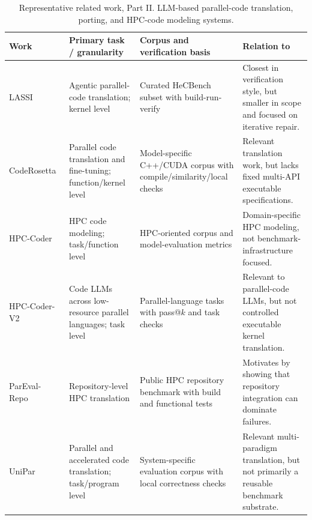 \begin{table}[p]
\centering
\caption{
Representative related work, Part II. LLM-based parallel-code translation, porting, and HPC-code modeling systems.
}
\label{tab:related-work-c}
\scriptsize
\setlength{\tabcolsep}{3.2pt}
\renewcommand{\arraystretch}{1.05}
\begin{tabularx}{\textwidth}{@{}
>{\RaggedRight\arraybackslash}p{}
>{\RaggedRight\arraybackslash}p{}
>{\RaggedRight\arraybackslash}p{}
>{\RaggedRight\arraybackslash}X
@{}}
\toprule
Work & Primary task / granularity & Corpus and verification basis & Relation to \parbench{} \\
\midrule

LASSI~\cite{LASSI2024}
& Agentic parallel-code translation; kernel level
& Curated HeCBench subset with build-run-verify
& Closest in verification style, but smaller in scope and focused on iterative repair. \\

CodeRosetta~\cite{CodeRosetta2024}
& Parallel code translation and fine-tuning; function/kernel level
& Model-specific C++/CUDA corpus with compile/similarity/local checks
& Relevant translation work, but lacks fixed multi-API executable specifications. \\

HPC-Coder~\cite{HPCCoder2024}
& HPC code modeling; task/function level
& HPC-oriented corpus and model-evaluation metrics
& Domain-specific HPC modeling, not benchmark-infrastructure focused. \\

HPC-Coder-V2~\cite{HPCCoderV2}
& Code LLMs across low-resource parallel languages; task level
& Parallel-language tasks with pass@$k$ and task checks
& Relevant to parallel-code LLMs, but not controlled executable kernel translation. \\

ParEval-Repo~\cite{ParEvalRepo2025}
& Repository-level HPC translation
& Public HPC repository benchmark with build and functional tests
& Motivates \parbench{} by showing that repository integration can dominate failures. \\

UniPar~\cite{UniPar2025}
& Parallel and accelerated code translation; task/program level
& System-specific evaluation corpus with local correctness checks
& Relevant multi-paradigm translation, but not primarily a reusable benchmark substrate. \\


\end{tabularx}
\end{table}

